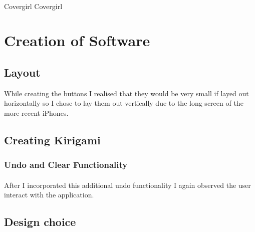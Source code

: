 \documentclass[11pt]{article}
\begin{document}
            
                \paragraph{}
                Covergirl Covergirl
            

\newpage
\section{Creation of Software}

 
    \subsection{Layout}
    While creating the buttons I realised that they would be very small if layed out horizontally so I chose to lay them out vertically due to the long screen of the more recent iPhones.
    
            \paragraph{}

    \subsection{Creating Kirigami}
    
            \paragraph{}
        
        \subsubsection{Undo and Clear Functionality}
        
            \paragraph{} 
            After I incorporated this additional undo functionality I again observed the user interact with the application. 

    \subsection{Design choice}
    
            \paragraph{}
\end{document}
